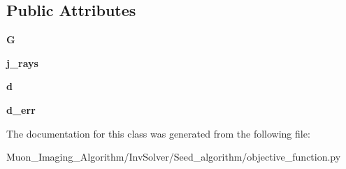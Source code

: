 \subsection*{Public Attributes}
\begin{DoxyCompactItemize}
\item 
\mbox{\label{classMIS_1_1Muon__Imaging__Algorithm_1_1InvSolver_1_1Seed__algorithm_1_1objective__function_1_1Obj__fun__Tools_a484311e0f07bb311215e743fabe4a127}} 
{\bfseries G}
\item 
\mbox{\label{classMIS_1_1Muon__Imaging__Algorithm_1_1InvSolver_1_1Seed__algorithm_1_1objective__function_1_1Obj__fun__Tools_a77e575e06ccc7aa05a15b21027dd6b85}} 
{\bfseries j\+\_\+rays}
\item 
\mbox{\label{classMIS_1_1Muon__Imaging__Algorithm_1_1InvSolver_1_1Seed__algorithm_1_1objective__function_1_1Obj__fun__Tools_acd4d2cadca72b269a647d72e36629273}} 
{\bfseries d}
\item 
\mbox{\label{classMIS_1_1Muon__Imaging__Algorithm_1_1InvSolver_1_1Seed__algorithm_1_1objective__function_1_1Obj__fun__Tools_ad73e26fd8dc2bcbf7885fb4bb81e3e15}} 
{\bfseries d\+\_\+err}
\end{DoxyCompactItemize}


The documentation for this class was generated from the following file\+:\begin{DoxyCompactItemize}
\item 
Muon\+\_\+\+Imaging\+\_\+\+Algorithm/\+Inv\+Solver/\+Seed\+\_\+algorithm/objective\+\_\+function.\+py\end{DoxyCompactItemize}
